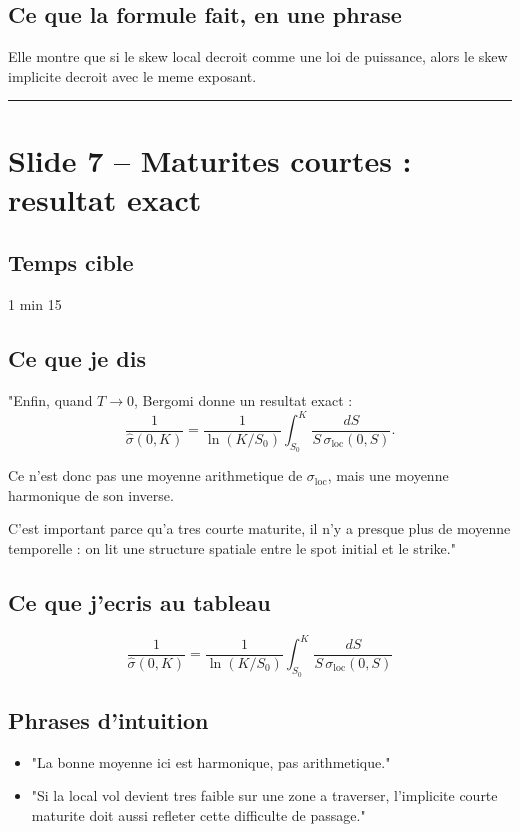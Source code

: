 \documentclass[11pt,a4paper]{article}
\begin{document}
\subsection{Ce que la formule fait, en une phrase}

Elle montre que si le skew local decroit comme une loi de puissance, alors le skew implicite decroit avec le meme exposant.

\bigskip\hrule\bigskip

\section{Slide 7 -- Maturites courtes : resultat exact}

\subsection{Temps cible}
1 min 15

\subsection{Ce que je dis}

"Enfin, quand \(T\to 0\), Bergomi donne un resultat exact :
\[
\frac{1}{\hat{\sigma}(0,K)}
=
\frac{1}{\ln(K/S_0)}
\int_{S_0}^{K}\frac{dS}{S\,\sigma_{\mathrm{loc}}(0,S)}.
\]

Ce n'est donc pas une moyenne arithmetique de \(\sigma_{\mathrm{loc}}\), mais une moyenne harmonique de son inverse.

C'est important parce qu'a tres courte maturite, il n'y a presque plus de moyenne temporelle : on lit une structure spatiale entre le spot initial et le strike."

\subsection{Ce que j'ecris au tableau}

\[
\frac{1}{\hat{\sigma}(0,K)}
=
\frac{1}{\ln(K/S_0)}
\int_{S_0}^{K}\frac{dS}{S\,\sigma_{\mathrm{loc}}(0,S)}
\]

\subsection{Phrases d'intuition}

\begin{itemize}
\item "La bonne moyenne ici est harmonique, pas arithmetique."
\item "Si la local vol devient tres faible sur une zone a traverser, l'implicite courte maturite doit aussi refleter cette difficulte de passage."
\end{itemize}
\end{document}
